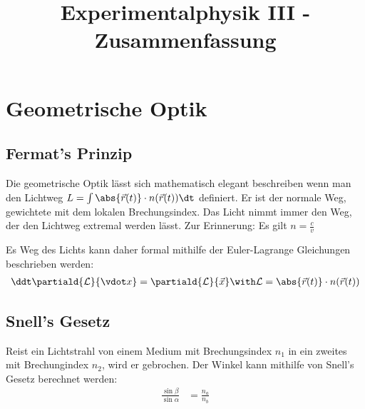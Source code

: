 \documentclass[twocolumn]{summery}
\title{Experimentalphysik III - Zusammenfassung}
\begin{document}
\maketitle
\tableofcontents

\section{Geometrische Optik}
\subsection{Fermat's Prinzip}
Die geometrische Optik lässt sich mathematisch elegant beschreiben wenn man den Lichtweg 
\(L = \int \abs{\vec r(t)}\cdot n(\vec r (t)) \dt\) definiert. Er ist der normale Weg, gewichtete 
mit dem lokalen Brechungsindex.
Das Licht nimmt immer den Weg, der den Lichtweg extremal werden lässt.
Zur Erinnerung: Es gilt \(n = \frac{c}{v}\)

Es Weg des Lichts kann daher formal mithilfe der Euler-Lagrange Gleichungen beschrieben werden:
\begin{align*}
    \ddt \partiald{\mathcal L}{\vdot x} = \partiald{\mathcal L}{\vec x} \with \mathcal L = \abs{\vec r(t)}\cdot n(\vec r (t))
\end{align*}

\subsection{Snell's Gesetz}
Reist ein Lichtstrahl von einem Medium mit Brechungsindex \(n_1\) in ein zweites mit 
Brechungindex \(n_2\), wird er gebrochen. Der Winkel kann mithilfe von Snell's Gesetz 
berechnet werden:
\begin{align*}
    \frac{\sin\beta}{\sin\alpha} &= \frac{n_a}{n_b}
\end{align*}
\end{document}
